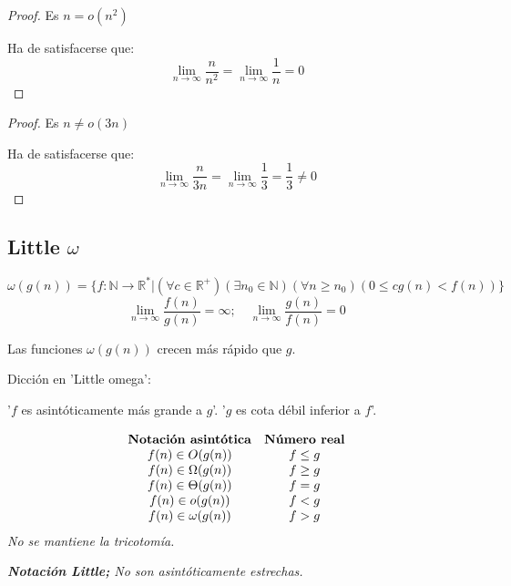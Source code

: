 \documentclass[tikz,11pt,fleqn]{book} %
\begin{document}
\begin{proof}
    Es $n=o(n^2)$
    
    Ha de satisfacerse que: $$
        \lim_{n\to\infty}\frac n{n^2}=\lim_{n\to\infty}\frac 1{n}=0
    $$
\end{proof}
\begin{proof}
    Es $n\neq o(3n)$
    
    Ha de satisfacerse que: $$
        \lim_{n\to\infty}\frac n{3n}=\lim_{n\to\infty}\frac 13=\frac 13\neq0
    $$
\end{proof}

\subsection{Little $\omega$}
\begin{definition}
$$
    \omega (g(n)) = \{ f : \mathbb N \to \mathbb R^* | (\forall c\in \mathbb R^+) (\exists n_0\in \mathbb N) (\forall n\ge n_0) ( 0 \le  c g(n) < f(n) ) \}
$$$$
    \lim_{n\to\infty}\frac{f(n)}{g(n)}= \infty;\quad
    \lim_{n\to\infty}\frac{g(n)}{f(n)}= 0
$$
\end{definition}
Las funciones $\omega({g(n)})$ crecen más rápido que $g$. 
\begin{remark}Dicción en 'Little omega':

    '$f$ es asintóticamente más grande a $g$'. '$g$ es cota débil inferior a $f$'.
\end{remark}

\begin{theorem}
    $$\begin{array}{cc}
        \text{\textbf{Notación asintótica}} & \text{\textbf{Número real}} \\
        f(n) \in O(g(n)) & f\le g \\
        f(n) \in \Omega(g(n)) & f\ge g \\
        f(n) \in \Theta(g(n)) & f= g \\
        f(n) \in o(g(n)) & f< g \\
        f(n) \in \omega(g(n)) & f> g \\
    \end{array}$$
    \textit{No se mantiene la tricotomía.}
\end{theorem}

\begin{remark}
    \textit{\textbf{Notación Little;} No son asintóticamente estrechas.}
\end{remark}
\end{document}
